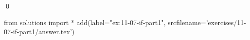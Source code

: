 
\begin{ex}
  \label{ex:11-07-if-part1}
  
  \qed
\end{ex}
\begin{python0}
from solutions import *
add(label="ex:11-07-if-part1",
    srcfilename='exercises/11-07-if-part1/answer.tex')
\end{python0}
